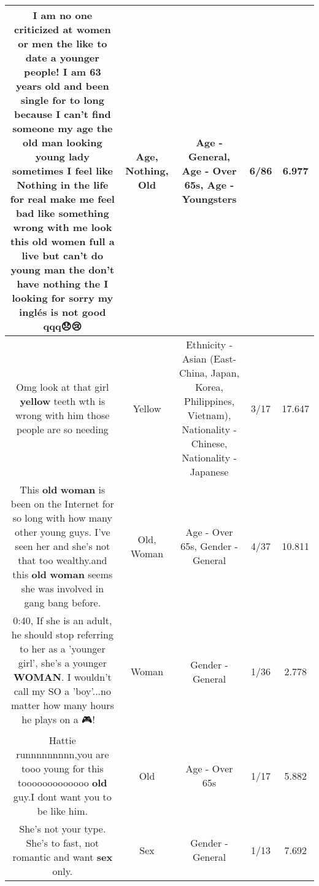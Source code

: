 \documentclass[11pt]{article}
\newlength\mylength
\begin{document}
\begin{center}
\begin{longtable}{|C{.65\mylength}|C{.30\mylength}|C{.12\mylength}|C{.12\mylength}|C{.12\mylength}|}
  \small I am no one criticized at women or men the like to date a younger people! I am 63 years \textbf{old} and been single for to long because I can't find someone my \textbf{age} the  \textbf{old} man looking young lady sometimes I feel like \textbf{Nothing} in the life for real make me feel bad like something wrong with me look this \textbf{old} women full a live but can't do young man the don't have \textbf{nothing} the I looking for sorry my inglés is not good qqq😞😢\normalsize   & Age, Nothing, Old & Age - General, Age - Over 65s, Age - Youngsters & 6/86 & 6.977 \\  \hline
  \small Omg look at that girl \textbf{y\textbf{e\textbf{llow}}} teeth wth is wrong with him those people are so needing\normalsize   & Yellow & Ethnicity - Asian (East- China, Japan, Korea, Philippines, Vietnam), Nationality - Chinese, Nationality - Japanese & 3/17 & 17.647 \\  \hline
  \small This \textbf{old} \textbf{woman} is been on the Internet for so long with how many other young guys. I've seen her and she's not that too wealthy.and this \textbf{old} \textbf{woman} seems she was involved in gang bang before.\normalsize   & Old, Woman & Age - Over 65s, Gender - General & 4/37 & 10.811 \\  \hline
  \small 0:40, If she is an adult, he should stop referring to her as a 'younger girl', she's a younger \textbf{WOMAN}. I wouldn't call my SO a 'boy'...no matter how many hours he plays on a 🎮!🤷🏽‍♀️\normalsize   & Woman & Gender - General & 1/36 & 2.778 \\  \hline
  \small Hattie runnnnnnnnn,you are tooo young for this tooooooooooooo \textbf{old} guy.I dont want you to be like him.\normalsize   & Old & Age - Over 65s & 1/17 & 5.882 \\  \hline
  \small She's not your type.  She's to fast, not romantic and want \textbf{sex} only.\normalsize   & Sex & Gender - General & 1/13 & 7.692 \\  \hline

\end{longtable}
\end{center}
\end{document}
